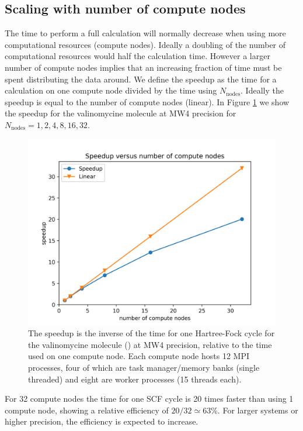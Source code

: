 \documentclass[journal=jctcce, manuscript=article]{achemso}
\begin{document}
\subsection{Scaling with number of compute nodes}

The time to perform a full calculation will normally decrease when using more computational resources (compute nodes). Ideally a doubling of the number of computational resources would half the calculation time. However a larger number of compute nodes implies that an increasing fraction of time must be spent distributing the data around. 
We define the speedup as the time for a calculation on one compute node divided by the time using $N_{\text{nodes}}$. Ideally the speedup is equal to the number of compute nodes (linear).    
In Figure \ref{fig03} we show the speedup for the valinomycine molecule at MW4 precision for $N_{\text{nodes}} = 1, 2, 4, 8, 16, 32$. 

\begin{figure}[htb]
\centering
\includegraphics[width=\textwidth]{CPUscaling.png}
\caption{The speedup is the inverse of the time for one Hartree-Fock cycle for the valinomycine molecule () at MW4 precision, relative to the time used on one compute node. Each compute node hosts 12 MPI processes, four of which are task manager/memory banks (single threaded) and eight are worker processes (15 threads each).}
\label{fig03}
\end{figure}

For 32 compute nodes the time for one SCF cycle is 20 times faster than using 1 compute node, showing a relative efficiency of $20/32 \simeq 63$\%.
For larger systems or higher precision, the efficiency is expected to increase.
\end{document}
